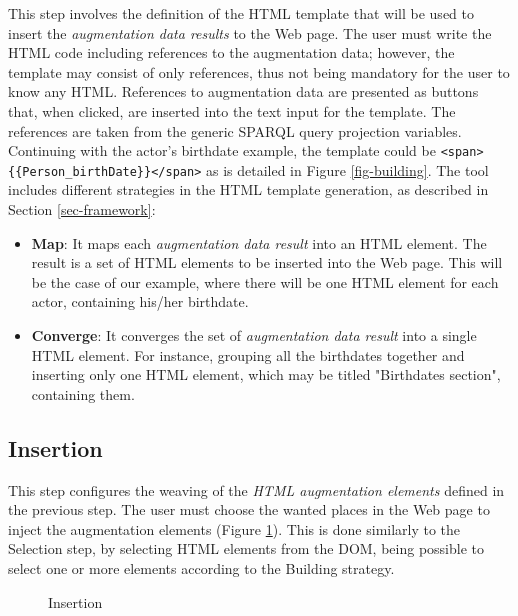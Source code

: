 \documentclass[runningheads]{llncs}
\begin{document}
This step involves the definition of the HTML template that will be used to insert the \textit{augmentation data results} to the Web page. The user must write the HTML code including references to the augmentation data; however, the template may consist of only references, thus not being mandatory for the user to know any HTML. References to augmentation data are presented as buttons that, when clicked, are inserted into the text input for the template. The references are taken from the generic SPARQL query projection variables. Continuing with the actor's birthdate example, the template could be \texttt{\textless{}span\textgreater{}\{\{Person\_birthDate\}\}\textless{}/span\textgreater{}} as is detailed in Figure \ref{fig-building}. The tool includes different strategies in the HTML template generation, as described in Section \ref{sec-framework}: 

\begin{itemize}
\item \textbf{Map}: It maps each \textit{augmentation data result} into an HTML element. The result is a set of HTML elements to be inserted into the Web page. This will be the case of our example, where there will be one HTML element for each actor, containing his/her birthdate.  

\item \textbf{Converge}: It converges the set of \textit{augmentation data result} into a single HTML element. For instance, grouping all the birthdates together and inserting only one HTML element, which may be titled "Birthdates section", containing them.
\end{itemize}


\subsection{Insertion}

This step configures the weaving of the \textit{HTML augmentation elements} defined in the previous step. The user must choose the wanted places in the Web page to inject the augmentation elements (Figure \ref{fig-insertion}). This is done similarly to the Selection step, by selecting HTML elements from the DOM, being possible to select one or more elements according to the Building strategy.

\begin{figure}
  \centering
    \caption{Insertion}
    \label{fig-insertion}
\end{figure}
\end{document}
